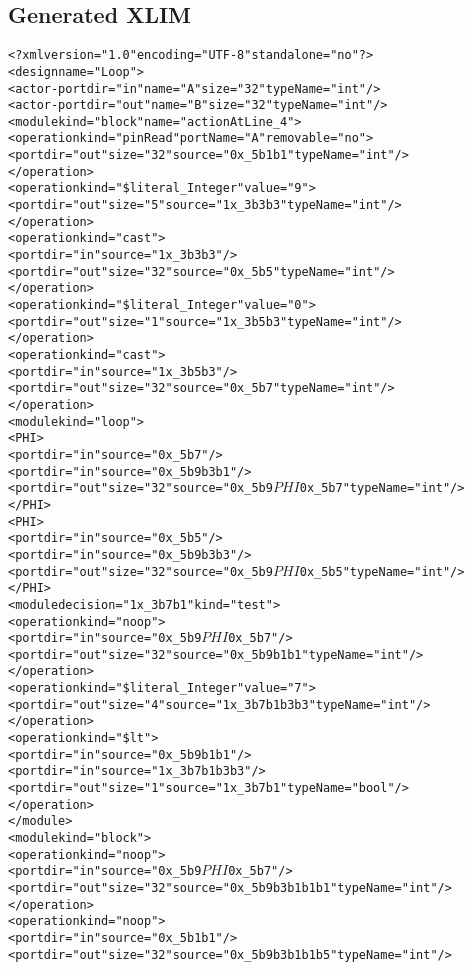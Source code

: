 \subsection{Generated XLIM}
\begin{alltt}
<?xml version="1.0" encoding="UTF-8" standalone="no"?>
<design name="Loop">
  <actor-port dir="in" name="A" size="32" typeName="int"/>
  <actor-port dir="out" name="B" size="32" typeName="int"/>
  <module kind="block" name="actionAtLine\_4">
    <operation kind="pinRead" portName="A" removable="no">
      <port dir="out" size="32" source="0x\_5b1b1" typeName="int"/>
    </operation>
    <operation kind="\$literal\_Integer" value="9">
      <port dir="out" size="5" source="1x\_3b3b3" typeName="int"/>
    </operation>
    <operation kind="cast">
      <port dir="in" source="1x\_3b3b3"/>
      <port dir="out" size="32" source="0x\_5b5" typeName="int"/>
    </operation>
    <operation kind="\$literal\_Integer" value="0">
      <port dir="out" size="1" source="1x\_3b5b3" typeName="int"/>
    </operation>
    <operation kind="cast">
      <port dir="in" source="1x\_3b5b3"/>
      <port dir="out" size="32" source="0x\_5b7" typeName="int"/>
    </operation>
    <module kind="loop">
      <PHI>
        <port dir="in" source="0x\_5b7"/>
        <port dir="in" source="0x\_5b9b3b1"/>
        <port dir="out" size="32" source="0x\_5b9$PHI$0x\_5b7" typeName="int"/>
      </PHI>
      <PHI>
        <port dir="in" source="0x\_5b5"/>
        <port dir="in" source="0x\_5b9b3b3"/>
        <port dir="out" size="32" source="0x\_5b9$PHI$0x\_5b5" typeName="int"/>
      </PHI>
      <module decision="1x\_3b7b1" kind="test">
        <operation kind="noop">
          <port dir="in" source="0x\_5b9$PHI$0x\_5b7"/>
          <port dir="out" size="32" source="0x\_5b9b1b1" typeName="int"/>
        </operation>
        <operation kind="\$literal\_Integer" value="7">
          <port dir="out" size="4" source="1x\_3b7b1b3b3" typeName="int"/>
        </operation>
        <operation kind="\$lt">
          <port dir="in" source="0x\_5b9b1b1"/>
          <port dir="in" source="1x\_3b7b1b3b3"/>
          <port dir="out" size="1" source="1x\_3b7b1" typeName="bool"/>
        </operation>
      </module>
      <module kind="block">
        <operation kind="noop">
          <port dir="in" source="0x\_5b9$PHI$0x\_5b7"/>
          <port dir="out" size="32" source="0x\_5b9b3b1b1b1" typeName="int"/>
        </operation>
        <operation kind="noop">
          <port dir="in" source="0x\_5b1b1"/>
          <port dir="out" size="32" source="0x\_5b9b3b1b1b5" typeName="int"/>

\end{alltt}
